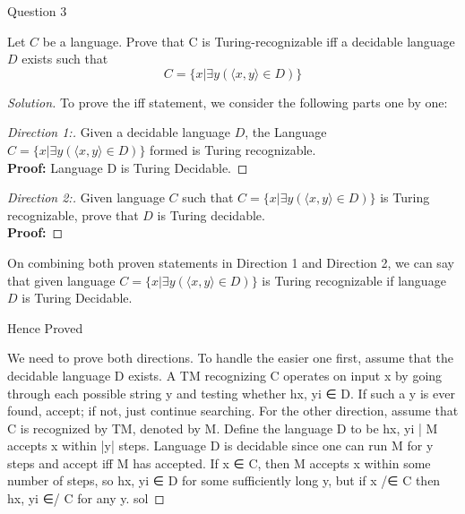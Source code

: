 \begin{solution}{Question 3}\label{ques:3}
    \begin{question}
        Let $C$ be a language. Prove that C is Turing-recognizable iff a decidable language $D$ exists such that
        $$C = \{ x | \exists y (\langle x,y \rangle \in D) \}$$
    \end{question}
    \tcblower{}
    \begin{proof}[Solution]
    To prove the iff statement, we consider the following parts one by one:
    \begin{proof}[Direction 1:]
    Given a decidable language $D$, the Language $C = \{ x | \exists y (\langle x,y \rangle \in D) \}$ formed is Turing recognizable. 
    \\
    \textbf{Proof:}
    Language D is Turing Decidable.
    
    
    \end{proof}
    
    \begin{proof}[Direction 2:]
    Given language $C$ such that $C = \{ x | \exists y (\langle x,y \rangle \in D) \}$ is Turing recognizable, prove that $D$ is Turing decidable.
    \\
    \textbf{Proof:}
    
    
    
    \end{proof}
    
    On combining both proven statements in Direction 1 and Direction 2, we can say that given language $C = \{ x | \exists y (\langle x,y \rangle \in D) \}$ is Turing recognizable if language $D$ is Turing Decidable.
    \begin{center}
        Hence Proved
    \end{center}
    
    We need to prove both directions. To handle the easier one first, assume that the decidable language D
exists. A TM recognizing C operates on input x by going through each possible string y and testing whether
hx, yi ∈ D. If such a y is ever found, accept; if not, just continue searching.
For the other direction, assume that C is recognized by TM, denoted by M. Define the language D to
be {hx, yi | M accepts x within |y| steps}. Language D is decidable since one can run M for y steps and
accept iff M has accepted. If x ∈ C, then M accepts x within some number of steps, so hx, yi ∈ D for some
sufficiently long y, but if x /∈ C then hx, yi ∈/ C for any y.
        sol
    \end{proof}
\end{solution}
